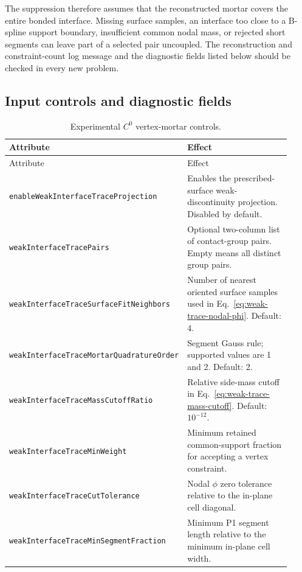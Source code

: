 The suppression therefore assumes that the reconstructed mortar covers the
entire bonded interface.  Missing surface samples, an interface too close to a
B-spline support boundary, insufficient common nodal mass, or rejected short
segments can leave part of a selected pair uncoupled.  The reconstruction and
constraint-count log message and the diagnostic fields listed below should be
checked in every new problem.

\subsection{Input controls and diagnostic fields}
\label{subsec:weak-trace-controls}

\begingroup\small
\begin{longtable}{>{\raggedright\arraybackslash}p{0.40\linewidth}>{\raggedright\arraybackslash}p{0.52\linewidth}}
\caption{Experimental $C^0$ vertex-mortar controls.}\label{tab:weak-trace-controls}\\
\toprule
Attribute & Effect \\
\midrule
\endfirsthead
\toprule
Attribute & Effect \\
\midrule
\endhead
\texttt{enableWeakInterfaceTraceProjection} & Enables the prescribed-surface weak-discontinuity projection.  Disabled by default. \\
\texttt{weakInterfaceTracePairs} & Optional two-column list of contact-group pairs.  Empty means all distinct group pairs. \\
\texttt{weakInterfaceTraceSurfaceFitNeighbors} & Number of nearest oriented surface samples used in Eq.~\eqref{eq:weak-trace-nodal-phi}.  Default: 4. \\
\texttt{weakInterfaceTraceMortarQuadratureOrder} & Segment Gauss rule; supported values are 1 and 2.  Default: 2. \\
\texttt{weakInterfaceTraceMassCutoffRatio} & Relative side-mass cutoff in Eq.~\eqref{eq:weak-trace-mass-cutoff}.  Default: $10^{-12}$. \\
\texttt{weakInterfaceTraceMinWeight} & Minimum retained common-support fraction for accepting a vertex constraint. \\
\texttt{weakInterfaceTraceCutTolerance} & Nodal $\phi$ zero tolerance relative to the in-plane cell diagonal. \\
\texttt{weakInterfaceTraceMinSegmentFraction} & Minimum P1 segment length relative to the minimum in-plane cell width. \\

\end{longtable}
